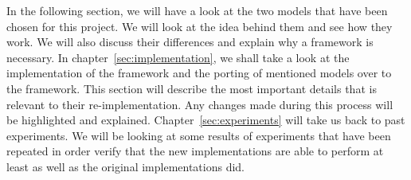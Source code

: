 In the following section, we will have a look at the two models that have been chosen for this project. We will look at the idea behind them and see how they work. We will also discuss their differences and explain why a framework is necessary. In chapter~\ref{sec:implementation}, we shall take a look at the implementation of the framework and the porting of mentioned models over to the framework. This section will describe the most important details that is relevant to their re-implementation. Any changes made during this process will be highlighted and explained. Chapter~\ref{sec:experiments} will take us back to past experiments. We will be looking at some results of experiments that have been repeated in order verify that the new implementations are able to perform at least as well as the original implementations did.
